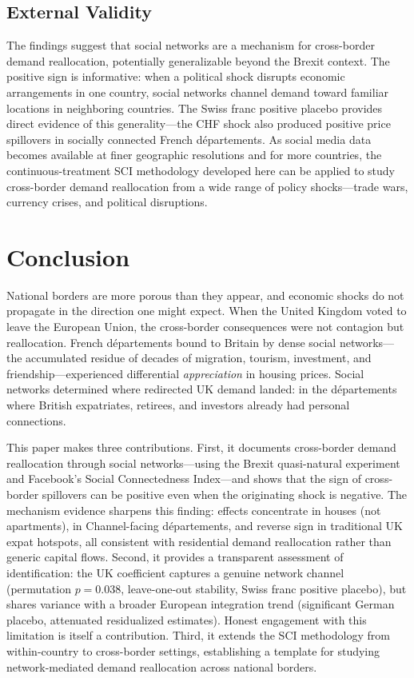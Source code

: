 \documentclass[12pt]{article}
\begin{document}
\subsection{External Validity}

The findings suggest that social networks are a mechanism for cross-border demand reallocation, potentially generalizable beyond the Brexit context. The positive sign is informative: when a political shock disrupts economic arrangements in one country, social networks channel demand toward familiar locations in neighboring countries. The Swiss franc positive placebo provides direct evidence of this generality---the CHF shock also produced positive price spillovers in socially connected French d\'epartements. As social media data becomes available at finer geographic resolutions and for more countries, the continuous-treatment SCI methodology developed here can be applied to study cross-border demand reallocation from a wide range of policy shocks---trade wars, currency crises, and political disruptions.


\section{Conclusion}

National borders are more porous than they appear, and economic shocks do not propagate in the direction one might expect. When the United Kingdom voted to leave the European Union, the cross-border consequences were not contagion but reallocation. French d\'epartements bound to Britain by dense social networks---the accumulated residue of decades of migration, tourism, investment, and friendship---experienced differential \textit{appreciation} in housing prices. Social networks determined where redirected UK demand landed: in the d\'epartements where British expatriates, retirees, and investors already had personal connections.

This paper makes three contributions. First, it documents cross-border demand reallocation through social networks---using the Brexit quasi-natural experiment and Facebook's Social Connectedness Index---and shows that the sign of cross-border spillovers can be positive even when the originating shock is negative. The mechanism evidence sharpens this finding: effects concentrate in houses (not apartments), in Channel-facing d\'epartements, and reverse sign in traditional UK expat hotspots, all consistent with residential demand reallocation rather than generic capital flows. Second, it provides a transparent assessment of identification: the UK coefficient captures a genuine network channel (permutation $p = 0.038$, leave-one-out stability, Swiss franc positive placebo), but shares variance with a broader European integration trend (significant German placebo, attenuated residualized estimates). Honest engagement with this limitation is itself a contribution. Third, it extends the SCI methodology from within-country to cross-border settings, establishing a template for studying network-mediated demand reallocation across national borders.
\end{document}

